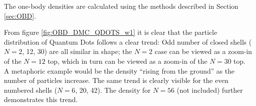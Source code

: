The one-body densities are calculated using the methods described in Section \ref{sec:OBD}.

From figure \ref{fig:OBD_DMC_QDOTS_w1} it is clear that the particle distribution of Quantum Dots follows a clear trend: Odd number of closed shells ($N=2$, 12, 30) are all similar in shape; the $N=2$ case can be viewed as a zoom-in of the $N=12$ top, which in turn can be viewed as a zoom-in of the $N=30$ top. A metaphoric example would be the density ``rising from the ground'' as the number of particles increase. The same trend is clearly visible for the even numbered shells ($N=6$, 20, 42). The density for $N=56$ (not included) further demonstrates this trend.










